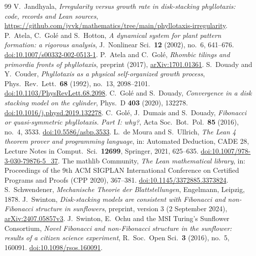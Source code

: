 \documentclass[11pt]{amsart}
\theoremstyle{definition}
\begin{document}
\begin{thebibliography}{99}
 V.~Jandhyala, \emph{Irregularity versus growth rate in disk-stacking phyllotaxis: code, records and Lean
sources}, \url{https://github.com/jvvk/mathematics/tree/main/phyllotaxis-irregularity}.
 P.~Atela, C.~Gol\'e and S.~Hotton, \emph{A dynamical system for plant pattern formation: a
rigorous analysis}, J.\ Nonlinear Sci.\ \textbf{12} (2002), no.~6, 641--676.
\href{https://doi.org/10.1007/s00332-002-0513-1}{doi:10.1007/s00332-002-0513-1}.
 P.~Atela and C.~Gol\'e, \emph{Rhombic tilings and primordia fronts of phyllotaxis},
preprint (2017), \href{https://arxiv.org/abs/1701.01361}{arXiv:1701.01361}.
 S.~Douady and Y.~Couder, \emph{Phyllotaxis as a physical self-organized growth
process}, Phys.\ Rev.\ Lett.\ \textbf{68} (1992), no.~13, 2098--2101.
\href{https://doi.org/10.1103/PhysRevLett.68.2098}{doi:10.1103/PhysRevLett.68.2098}.
 C.~Gol\'e and S.~Douady, \emph{Convergence in a disk stacking model on the cylinder},
Phys.\ D \textbf{403} (2020), 132278.
\href{https://doi.org/10.1016/j.physd.2019.132278}{doi:10.1016/j.physd.2019.132278}.
 C.~Gol\'e, J.~Dumais and S.~Douady, \emph{Fibonacci or quasi-symmetric phyllotaxis. Part I:
why?}, Acta Soc.\ Bot.\ Pol.\ \textbf{85} (2016), no.~4, 3533.
\href{https://doi.org/10.5586/asbp.3533}{doi:10.5586/asbp.3533}.
 L.~de Moura and S.~Ullrich, \emph{The Lean 4 theorem prover and programming language},
in: Automated Deduction, CADE 28, Lecture Notes in Comput.\ Sci.\ \textbf{12699}, Springer, 2021, 625--635.
\href{https://doi.org/10.1007/978-3-030-79876-5_37}{doi:10.1007/978-3-030-79876-5\_37}.
 The mathlib Community, \emph{The Lean mathematical library}, in: Proceedings of the 9th
ACM SIGPLAN International Conference on Certified Programs and Proofs (CPP 2020), 367--381.
\href{https://doi.org/10.1145/3372885.3373824}{doi:10.1145/3372885.3373824}.
 S.~Schwendener, \emph{Mechanische Theorie der Blattstellungen}, Engelmann, Leipzig, 1878.
 J.~Swinton, \emph{Disk-stacking models are consistent with Fibonacci and non-Fibonacci
structure in sunflowers}, preprint, version 3 (2 September 2024),
\href{https://arxiv.org/abs/2407.05857v3}{arXiv:2407.05857v3}.
 J.~Swinton, E.~Ochu and the MSI Turing's Sunflower Consortium, \emph{Novel Fibonacci
and non-Fibonacci structure in the sunflower: results of a citizen science experiment}, R.\ Soc.\ Open
Sci.\ \textbf{3} (2016), no.~5, 160091.
\href{https://doi.org/10.1098/rsos.160091}{doi:10.1098/rsos.160091}.
\end{thebibliography}
\end{document}
